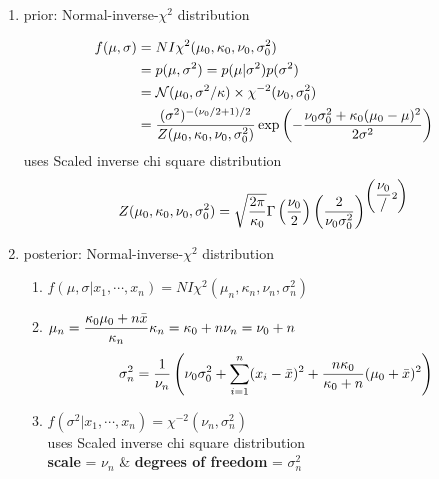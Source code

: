 \begin{enumerate}[itemsep=0.2cm]
\begin{enumerate}[itemsep=0.2cm]
        \item prior: Normal-inverse-$\chi^2$ distribution

        \renewcommand{\arraystretch}{2}
        \begin{align*}
            f(\mu,\sigma)
            &= NI\chi^2(\mu_0, \kappa_0, \nu_0, \sigma_0^2) \\
            &= p(\mu,\sigma^2) = p(\mu|\sigma^2)p(\sigma^2)
            \\
            &= \mathcal{N}(\mu_0, \sigma^2/\kappa) \times
                \chi^{-2}(\nu_0, \sigma_0^2)\\
            &= \dfrac{
                (\sigma^2)^{-({\nu_0/2+1})/{2}}
            }{
                Z(\mu_0, \kappa_0, \nu_0, \sigma_0^2)
            } 
            \exp\left(
                -\dfrac{\nu_0\sigma_0^2 + \kappa_0(\mu_0-\mu)^2}{2\sigma^2}
            \right)
        \end{align*}
        \renewcommand{\arraystretch}{1}
        uses Scaled inverse chi square distribution
        \[
            Z(\mu_0, \kappa_0, \nu_0, \sigma_0^2)
            = \sqrt{\dfrac{2\pi}{\kappa_0}} 
            \Gamma\left(\dfrac{\nu_0}{2}\right)
            \left(\dfrac{2}{\nu_0\sigma_0^2}\right)
            ^{\left(\dfrac{\nu_0}/{2}\right)}
        \]

        \item posterior: Normal-inverse-$\chi^2$ distribution
        \begin{enumerate}[itemsep=0.2cm]
            \item $
                f(\mu,\sigma|x_1,\cdots,x_n)
                = NI\chi^2(\mu_n, \kappa_n, \nu_n, \sigma_n^2) 
            $

            \item $
                \hfill
                \mu_n = \dfrac{\kappa_0\mu_0+n\bar{x}}{\kappa_n}
                \hfill
                \kappa_n = \kappa_0 + n
                \hfill
                \nu_n = \nu_0 + n
                \hfill
            $
            \[
                \hfill
                \sigma_n^2 = \dfrac{1}{\nu_n}
                \dParenBrac{
                    \nu_0\sigma_0^2
                    +\dsum_{i=1}^n (x_i-\bar{x})^2
                    +\dfrac{n\kappa_0}{\kappa_0 + n}
                    (\mu_0 + \bar{x})^2
                }
                \hfill
            \]

            \item $
                f(\sigma^2|x_1,\cdots,x_n) = \chi^{-2}(\nu_n, \sigma_n^2)
            $ \\[2ex]
            uses Scaled inverse chi square distribution \\
            \textbf{scale} = $\nu_n$ \& 
            \textbf{degrees of freedom} = $\sigma_n^2$


\end{enumerate}
\end{enumerate}
\end{enumerate}
